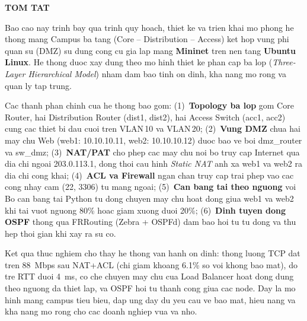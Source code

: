 \begin{center}
\pagestyle{empty}
\Large \textbf{TOM TAT}
\end{center}

\vspace{0.5cm}
Bao cao nay trinh bay qua trinh quy hoach, thiet ke va trien khai mo phong he thong mang Campus
ba tang (Core -- Distribution -- Access) ket hop vung phi quan su (DMZ) su dung cong cu gia lap mang
\textbf{Mininet} tren nen tang \textbf{Ubuntu Linux}. He thong duoc xay dung theo mo hinh thiet ke phan cap ba lop
(\textit{Three-Layer Hierarchical Model}) nham dam bao tinh on dinh, kha nang mo rong va quan ly tap trung.

Cac thanh phan chinh cua he thong bao gom: 
(1)~\textbf{Topology ba lop} gom Core Router, hai Distribution Router (dist1, dist2), hai Access Switch (acc1, acc2) cung cac thiet bi dau cuoi tren VLAN\,10 va VLAN\,20; 
(2)~\textbf{Vung DMZ} chua hai may chu Web (web1: 10.10.10.11, web2: 10.10.10.12) duoc bao ve boi dmz\_router va sw\_dmz; 
(3)~\textbf{NAT/PAT} cho phep cac may chu noi bo truy cap Internet qua dia chi ngoai 203.0.113.1, dong thoi cau hinh \textit{Static NAT} anh xa web1 va web2 ra dia chi cong khai; 
(4)~\textbf{ACL va Firewall} ngan chan truy cap trai phep vao cac cong nhay cam (22, 3306) tu mang ngoai;
(5)~\textbf{Can bang tai theo nguong} voi Bo can bang tai Python tu dong chuyen may chu hoat dong giua web1 va web2 khi tai vuot nguong 80\% hoac giam xuong duoi 20\%;
(6)~\textbf{Dinh tuyen dong OSPF} thong qua FRRouting (Zebra + OSPFd) dam bao hoi tu tu dong va thu hep thoi gian khi xay ra su co.

Ket qua thuc nghiem cho thay he thong van hanh on dinh: thong luong TCP dat tren 88~Mbps sau NAT+ACL
(chi giam khoang 6.1\% so voi khong bao mat), do tre RTT duoi 4~ms, co che chuyen may chu cua Load Balancer
hoat dong dung theo nguong da thiet lap, va OSPF hoi tu thanh cong giua cac node.
Day la mo hinh mang campus tieu bieu, dap ung day du yeu cau ve bao mat, hieu nang va kha nang mo rong
cho cac doanh nghiep vua va nho.